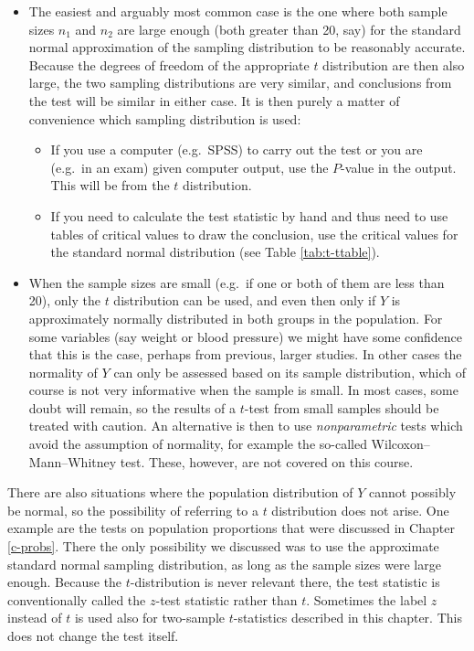 \documentclass[11pt,a4paper,openany]{book}
\begin{document}
\begin{itemize}
\item
  The easiest and arguably most common case is the one where both sample
  sizes \(n_{1}\) and \(n_{2}\) are large enough (both greater than 20,
  say) for the standard normal approximation of the sampling
  distribution to be reasonably accurate. Because the degrees of freedom
  of the appropriate \(t\) distribution are then also large, the two
  sampling distributions are very similar, and conclusions from the test
  will be similar in either case. It is then purely a matter of
  convenience which sampling distribution is used:

  \begin{itemize}
  \item
    If you use a computer (e.g.~SPSS) to carry out the test or you are
    (e.g.~in an exam) given computer output, use the \(P\)-value in the
    output. This will be from the \(t\) distribution.
  \item
    If you need to calculate the test statistic by hand and thus need to
    use tables of critical values to draw the conclusion, use the
    critical values for the standard normal distribution (see Table
    \ref{tab:t-ttable}).
  \end{itemize}
\item
  When the sample sizes are small (e.g.~if one or both of them are less
  than 20), only the \(t\) distribution can be used, and even then only
  if \(Y\) is approximately normally distributed in both groups in the
  population. For some variables (say weight or blood pressure) we might
  have some confidence that this is the case, perhaps from previous,
  larger studies. In other cases the normality of \(Y\) can only be
  assessed based on its sample distribution, which of course is not very
  informative when the sample is small. In most cases, some doubt will
  remain, so the results of a \(t\)-test from small samples should be
  treated with caution. An alternative is then to use
  \emph{nonparametric} tests which avoid the assumption of normality,
  for example the so-called Wilcoxon--Mann--Whitney test. These,
  however, are not covered on this course.
\end{itemize}

There are also situations where the population distribution of \(Y\)
cannot possibly be normal, so the possibility of referring to a \(t\)
distribution does not arise. One example are the tests on population
proportions that were discussed in Chapter \ref{c-probs}. There the only
possibility we discussed was to use the approximate standard normal
sampling distribution, as long as the sample sizes were large enough.
Because the \(t\)-distribution is never relevant there, the test
statistic is conventionally called the \(z\)-test statistic rather than
\(t\). Sometimes the label \(z\) instead of \(t\) is used also for
two-sample \(t\)-statistics described in this chapter. This does not
change the test itself.
\end{document}
